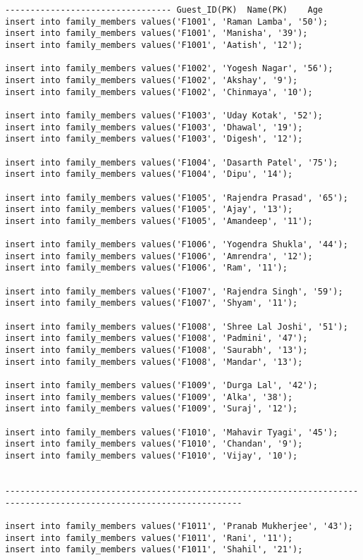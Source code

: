 \documentclass[a4,12pt]{report}
\begin{document}
\begin{lstlisting}
--------------------------------- Guest_ID(PK)  Name(PK)    Age
insert into family_members values('F1001', 'Raman Lamba', '50');
insert into family_members values('F1001', 'Manisha', '39');
insert into family_members values('F1001', 'Aatish', '12');

insert into family_members values('F1002', 'Yogesh Nagar', '56');
insert into family_members values('F1002', 'Akshay', '9');
insert into family_members values('F1002', 'Chinmaya', '10');

insert into family_members values('F1003', 'Uday Kotak', '52');
insert into family_members values('F1003', 'Dhawal', '19');
insert into family_members values('F1003', 'Digesh', '12');

insert into family_members values('F1004', 'Dasarth Patel', '75');
insert into family_members values('F1004', 'Dipu', '14');

insert into family_members values('F1005', 'Rajendra Prasad', '65');
insert into family_members values('F1005', 'Ajay', '13');
insert into family_members values('F1005', 'Amandeep', '11');

insert into family_members values('F1006', 'Yogendra Shukla', '44');
insert into family_members values('F1006', 'Amrendra', '12');
insert into family_members values('F1006', 'Ram', '11');

insert into family_members values('F1007', 'Rajendra Singh', '59');
insert into family_members values('F1007', 'Shyam', '11');

insert into family_members values('F1008', 'Shree Lal Joshi', '51');
insert into family_members values('F1008', 'Padmini', '47');
insert into family_members values('F1008', 'Saurabh', '13');
insert into family_members values('F1008', 'Mandar', '13');

insert into family_members values('F1009', 'Durga Lal', '42');
insert into family_members values('F1009', 'Alka', '38');
insert into family_members values('F1009', 'Suraj', '12');

insert into family_members values('F1010', 'Mahavir Tyagi', '45');
insert into family_members values('F1010', 'Chandan', '9');
insert into family_members values('F1010', 'Vijay', '10');


---------------------------------------------------------------------------------------------------------------------

insert into family_members values('F1011', 'Pranab Mukherjee', '43');
insert into family_members values('F1011', 'Rani', '11');
insert into family_members values('F1011', 'Shahil', '21');


\end{lstlisting}
\end{document}
